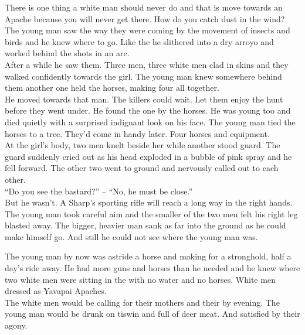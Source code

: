 There is one thing a white man should never do and that is move towards an Apache because you will never get there. How do you catch dust in the wind? The young man saw the way they were coming by the movement of insects and birds and he knew where to go. Like the  he slithered into a dry arroyo and worked behind the shots in an arc. \\

After a while he saw them. Three men, three white men clad in skins and they walked confidently towards the girl. The young man knew somewhere behind them another one held the horses, making four all together. \\

He moved towards that man. The killers could wait. Let them enjoy the hunt before they went under. He found the one by the horses. He was young too and died quietly with a surprised indignant look on his face. The young man tied the horses to a tree. They'd come in handy later. Four horses and equipment. \\

At the girl's body, two men knelt beside her while another stood guard. The guard suddenly cried out as his head exploded in a bubble of pink spray and he fell forward. The other two went to ground and nervously called out to each other. \\

``Do you see the bastard?'' -- ``No, he must be close.'' \\

But he wasn't. A Sharp's sporting rifle will reach a long way in the right hands. The young man took careful aim and the smaller of the two men felt his right leg blasted away. The bigger, heavier man sank as far into the ground as he could make himself go. And still he could not see where the young man was. \\




The young man by now was astride a horse and making for a  stronghold, half a day's ride away. He had more guns and horses than he needed and he knew where two white men were sitting in the  with no water and no horses. White men dressed as Yavapai Apaches. \\

The white men would be calling for their mothers and their  by evening. The young man would be drunk on tiswin and full of deer meat. And satisfied by their agony. \\
